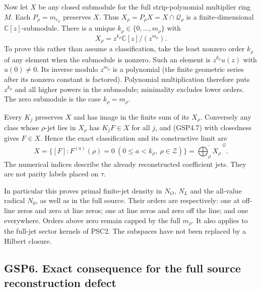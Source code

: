 Now let \(X\) be any closed submodule for the full strip-polynomial
multiplier ring \(M\). Each \(P_\rho=m_{e_\rho}\) preserves \(X\). Thus
\(X_\rho=P_\rho X=X\cap\mathcal Q_\rho\) is a finite-dimensional
\(\mathbb C[z]\)-submodule. There is a unique
\(k_\rho\in\{0,\ldots,m_\rho\}\) with \[
X_\rho=z^{k_\rho}\mathbb C[z]/(z^{m_\rho}).
\tag{GSP5.2}
\] To prove this rather than assume a classification, take the least
nonzero order \(k_\rho\) of any element when the submodule is nonzero.
Such an element is \(z^{k_\rho}u(z)\) with \(u(0)\ne0\). Its inverse
modulo \(z^{m_\rho}\) is a polynomial (the finite geometric series after
its nonzero constant is factored). Polynomial multiplication therefore
puts \(z^{k_\rho}\) and all higher powers in the submodule; minimality
excludes lower orders. The zero submodule is the case \(k_\rho=m_\rho\).

Every \(K_j\) preserves \(X\) and has image in the finite sum of its
\(X_\rho\). Conversely any class whose \(\rho\)-jet lies in \(X_\rho\)
has \(K_jF\in X\) for all \(j\), and (GSP4.7) with closedness gives
\(F\in X\). Hence the exact classification and its constructive limit
are \[
\boxed{X=\{[F]:F^{(a)}(\rho)=0\ (0\le a<k_\rho,\ \rho\in\mathscr Z)\}
=\overline{\bigoplus_\rho X_\rho}^{\ \mathcal Q}.}
\tag{GSP5.3}
\] The numerical indices describe the already reconstructed coefficient
jets. They are not parity labels placed on \(\tau\).

In particular this proves primal finite-jet density in \(N_O\), \(N_L\)
and the all-value radical \(N_0\), as well as in the full source. Their
orders are respectively: one at off-line zeros and zero at line zeros;
one at line zeros and zero off the line; and one everywhere. Orders
above zero remain capped by the full \(m_\rho\). It also applies to the
full-jet sector kernels of PSC2. The subspaces have not been replaced by
a Hilbert closure.

\subsection{GSP6. Exact consequence for the full source reconstruction
defect}\label{gsp6.-exact-consequence-for-the-full-source-reconstruction-defect}

